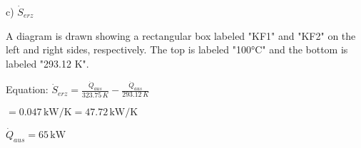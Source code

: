 c) \( \dot{S}_{erz} \)  

A diagram is drawn showing a rectangular box labeled "KF1" and "KF2" on the left and right sides, respectively. The top is labeled "100°C" and the bottom is labeled "293.12 K".  

Equation:  
\( \dot{S}_{erz} = \frac{\dot{Q}_{aus}}{323.75 \, K} - \frac{\dot{Q}_{aus}}{293.12 \, K} \)  

\( = 0.047 \, \text{kW/K} = 47.72 \, \text{kW/K} \)  

\( \dot{Q}_{aus} = 65 \, \text{kW} \)